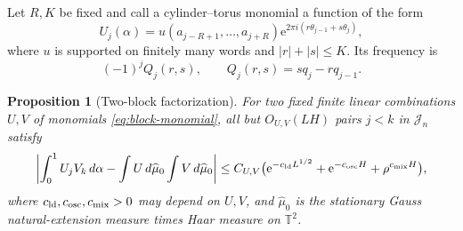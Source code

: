 \documentclass[11pt,a4paper]{amsart}
\newtheorem{proposition}[theorem]{Proposition}
\theoremstyle{definition}
\theoremstyle{remark}
\newcommand{\T}{\mathbb T}
\newcommand{\e}{\mathrm e}
\begin{document}
Let $R,K$ be fixed and call a cylinder--torus monomial a function of the form
\begin{equation}\label{eq:block-monomial}
 U_j(\alpha)=u(a_{j-R+1},\ldots,a_{j+R})
 \e^{2\pi i(r\theta_{j-1}+s\theta_j)},
\end{equation}
where $u$ is supported on finitely many words and $|r|+|s|\le K$.  Its
frequency is
\begin{equation}\label{eq:block-frequency}
 (-1)^jQ_j(r,s),\qquad Q_j(r,s)=sq_j-rq_{j-1}.
\end{equation}

\begin{proposition}[Two-block factorization]\label{prop:two-block}
For two fixed finite linear combinations $U,V$ of monomials
\eqref{eq:block-monomial}, all but $O_{U,V}(LH)$ pairs
$j<k$ in $\mathcal J_n$ satisfy
\begin{equation}\label{eq:two-block}
 \left|\int_0^1U_jV_k\,d\alpha
 -\int U\,d\widehat\mu_0\int V\,d\widehat\mu_0\right|
 \le C_{U,V}\bigl(\e^{-c_{\rm ld}L^{1/2}}
                    +\e^{-c_{\rm osc}H}
                    +\rho^{c_{\rm mix}H}\bigr),
\end{equation}
where $c_{\rm ld},c_{\rm osc},c_{\rm mix}>0$ may depend on $U,V$, and
$\widehat\mu_0$ is the stationary Gauss natural-extension measure times
Haar measure on $\T^2$.
\end{proposition}
\end{document}
